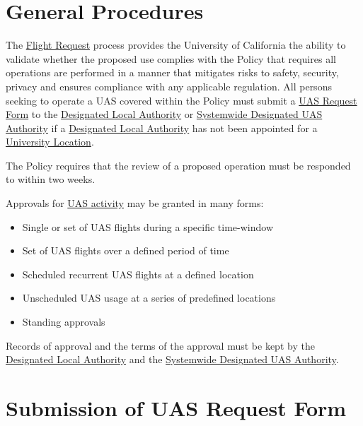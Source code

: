 \documentclass[
]{book}
\providecommand{\tightlist}{%
  \setlength{\itemsep}{0pt}\setlength{\parskip}{0pt}}
\begin{document}
\hypertarget{s-general}{%
\section{General Procedures}\label{s-general}}

The \protect\hyperlink{FR}{Flight Request} process provides the University of California the ability to validate whether the proposed use complies with the Policy that requires all operations are performed in a manner that mitigates risks to safety, security, privacy and ensures compliance with any applicable regulation. All persons seeking to operate a UAS covered within the Policy must submit a \protect\hyperlink{FR}{UAS Request Form} to the \protect\hyperlink{DLA}{Designated Local Authority} or \protect\hyperlink{SDA}{Systemwide Designated UAS Authority} if a \protect\hyperlink{DLA}{Designated Local Authority} has not been appointed for a \protect\hyperlink{UL}{University Location}.

The Policy requires that the review of a proposed operation must be responded to within two weeks.

Approvals for \protect\hyperlink{UASactivity}{UAS activity} may be granted in many forms:

\begin{itemize}
\tightlist
\item
  Single or set of UAS flights during a specific time-window
\item
  Set of UAS flights over a defined period of time
\item
  Scheduled recurrent UAS flights at a defined location
\item
  Unscheduled UAS usage at a series of predefined locations
\item
  Standing approvals
\end{itemize}

Records of approval and the terms of the approval must be kept by the \protect\hyperlink{DLA}{Designated Local Authority} and the \protect\hyperlink{SDA}{Systemwide Designated UAS Authority}.

\hypertarget{s-form}{%
\section{Submission of UAS Request Form}\label{s-form}}
\end{document}
